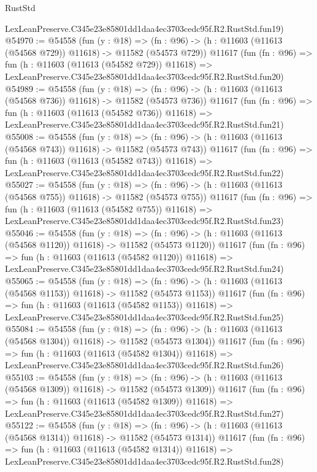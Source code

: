 \begin{lexlean}{RustStd}
\begin{coremodule}
    LexLeanPreserve.C345e23e85801dd1daa4ec3703cedc95f.R2.RustStd.fun19)
@54970 := @54558
    (fun (y : @18) =>
    (fn : @96) -> (h : @11603 (@11613 (@54568 @729)) @11618) -> @11582 (@54573 @729))
    @11617
    (fun (fn : @96) =>
    fun (h : @11603 (@11613 (@54582 @729)) @11618) =>
    LexLeanPreserve.C345e23e85801dd1daa4ec3703cedc95f.R2.RustStd.fun20)
@54989 := @54558
    (fun (y : @18) =>
    (fn : @96) -> (h : @11603 (@11613 (@54568 @736)) @11618) -> @11582 (@54573 @736))
    @11617
    (fun (fn : @96) =>
    fun (h : @11603 (@11613 (@54582 @736)) @11618) =>
    LexLeanPreserve.C345e23e85801dd1daa4ec3703cedc95f.R2.RustStd.fun21)
@55008 := @54558
    (fun (y : @18) =>
    (fn : @96) -> (h : @11603 (@11613 (@54568 @743)) @11618) -> @11582 (@54573 @743))
    @11617
    (fun (fn : @96) =>
    fun (h : @11603 (@11613 (@54582 @743)) @11618) =>
    LexLeanPreserve.C345e23e85801dd1daa4ec3703cedc95f.R2.RustStd.fun22)
@55027 := @54558
    (fun (y : @18) =>
    (fn : @96) -> (h : @11603 (@11613 (@54568 @755)) @11618) -> @11582 (@54573 @755))
    @11617
    (fun (fn : @96) =>
    fun (h : @11603 (@11613 (@54582 @755)) @11618) =>
    LexLeanPreserve.C345e23e85801dd1daa4ec3703cedc95f.R2.RustStd.fun23)
@55046 := @54558
    (fun (y : @18) =>
    (fn : @96) -> (h : @11603 (@11613 (@54568 @1120)) @11618) -> @11582 (@54573 @1120))
    @11617
    (fun (fn : @96) =>
    fun (h : @11603 (@11613 (@54582 @1120)) @11618) =>
    LexLeanPreserve.C345e23e85801dd1daa4ec3703cedc95f.R2.RustStd.fun24)
@55065 := @54558
    (fun (y : @18) =>
    (fn : @96) -> (h : @11603 (@11613 (@54568 @1153)) @11618) -> @11582 (@54573 @1153))
    @11617
    (fun (fn : @96) =>
    fun (h : @11603 (@11613 (@54582 @1153)) @11618) =>
    LexLeanPreserve.C345e23e85801dd1daa4ec3703cedc95f.R2.RustStd.fun25)
@55084 := @54558
    (fun (y : @18) =>
    (fn : @96) -> (h : @11603 (@11613 (@54568 @1304)) @11618) -> @11582 (@54573 @1304))
    @11617
    (fun (fn : @96) =>
    fun (h : @11603 (@11613 (@54582 @1304)) @11618) =>
    LexLeanPreserve.C345e23e85801dd1daa4ec3703cedc95f.R2.RustStd.fun26)
@55103 := @54558
    (fun (y : @18) =>
    (fn : @96) -> (h : @11603 (@11613 (@54568 @1309)) @11618) -> @11582 (@54573 @1309))
    @11617
    (fun (fn : @96) =>
    fun (h : @11603 (@11613 (@54582 @1309)) @11618) =>
    LexLeanPreserve.C345e23e85801dd1daa4ec3703cedc95f.R2.RustStd.fun27)
@55122 := @54558
    (fun (y : @18) =>
    (fn : @96) -> (h : @11603 (@11613 (@54568 @1314)) @11618) -> @11582 (@54573 @1314))
    @11617
    (fun (fn : @96) =>
    fun (h : @11603 (@11613 (@54582 @1314)) @11618) =>
    LexLeanPreserve.C345e23e85801dd1daa4ec3703cedc95f.R2.RustStd.fun28)

\end{coremodule}
\end{lexlean}
